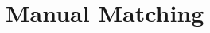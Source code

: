 \documentclass[12pt]{article}
\begin{document}
\begin{comment}
Prior to mechanically undertaking this step, it is useful to understand the role of primary issue markers.
The $LINKPRIM$ variable in the dataset can either denote primary or secondary markers.
In this field, \textit{'P'} is the primary marker; \textit{'J'} marks a secondary issue; \textit{'C'} is assigned by CRSP to resolve overlapping or missing primary markers, and \textit{'N'} is an overriding entry.
The \textit{N} marker distinguishes US and Canadian securities that Compustat would otherwise identify by the same GVKEY.


Centerpoint Energy is a case in point when matched on ticker symbol to Compustat via CRSP in this process.
With a sample period of interest between 1974 and 2002, matching based on the CCM Linkhist information yields one GVKEY-year observation for 2002 and a different GVKEY-year match for the period between 1980 and 2001.
This latter GVKEY changes between being a primary vs overlapping marker and first vs second firm-level security with no particular pattern.
Closer inspection of the data reveals that the GVKEY to PERMCO link that is only valid between Janury 1, 2002 and June 9, 2004 based on CCM Linkhist, is in fact the primary GVKEY since January 31, 1962.
This finding motivates the subsequent step to create a match with higher priority that employs the GVKEY validity period.
These matching steps for the example firm are available in the \texttt{Example\_CNP.sas} file.




In order to ensure that only one of the observations are kept, I assign a preference number to each type of marker for observations denoted \textit{'P'} taking the highest value of 4.
The observations are then sorted on CompanyID and TYEAR in ascending order and on this preference number (\textit{LPID}) in descending order.
Next, SAS is instructed to remove duplicates of CompanyID and TYEAR pairs.
Given the reverse sorting on LPID, observations with \textit{'P'} will be kept over observations with any of the other other markers.

\footnote{\url{https://wrds-web.wharton.upenn.edu/wrds/tools/variable.cfm?library_id=137&file_id=66980}}


\end{comment}

\section{Manual Matching}\label{sec:manual}
\end{document}
